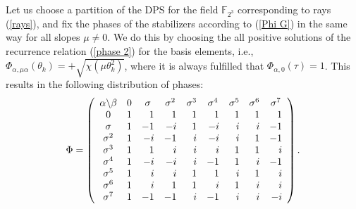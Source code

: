 \documentclass{article}
\begin{document}
Let us choose a partition of the DPS for the field $\mathbb{F}_{2^{3}}$
corresponding to rays (\ref{rays}), and fix the phases of the stabilizers
according to (\ref{Phi G}) in the same way for all slopes $\mu \neq 0$. We do
this by choosing the all positive solutions of the recurrence relation
(\ref{phase 2}) for the basis elements, i.e.,
$\Phi_{\alpha,\mu\alpha}(\theta_{k}) =
+\sqrt{\chi\left(\mu\theta_{k}^{2}\right)}$, where it is always fulfilled that
$\Phi_{\alpha,0}(\tau) = 1$. This results in the following distribution of
phases: 
\begin{equation}
  \Phi
  =\left( 
  \begin{array}{ccccccccc}
    \alpha \backslash \beta & 0 & \sigma & \sigma ^{2} & \sigma ^{3} & \sigma
    ^{4} & \sigma ^{5} & \sigma ^{6} & \sigma ^{7} \\ 
    0 & \multicolumn{1}{r}{1} & \multicolumn{1}{r}{1} & \multicolumn{1}{r}{1} & 
    \multicolumn{1}{r}{1} & \multicolumn{1}{r}{1} & \multicolumn{1}{r}{1} & 
    \multicolumn{1}{r}{1} & \multicolumn{1}{r}{1} \\ 
    \sigma & \multicolumn{1}{r}{1} & \multicolumn{1}{r}{-1} & \multicolumn{1}{r}{
    -i} & \multicolumn{1}{r}{1} & \multicolumn{1}{r}{-i} & \multicolumn{1}{r}{i}
    & \multicolumn{1}{r}{i} & \multicolumn{1}{r}{-1} \\ 
    \sigma ^{2} & \multicolumn{1}{r}{1} & \multicolumn{1}{r}{-i} & 
    \multicolumn{1}{r}{-1} & \multicolumn{1}{r}{i} & \multicolumn{1}{r}{-i} & 
    \multicolumn{1}{r}{i} & \multicolumn{1}{r}{1} & \multicolumn{1}{r}{-1} \\ 
    \sigma ^{3} & \multicolumn{1}{r}{1} & \multicolumn{1}{r}{1} & 
    \multicolumn{1}{r}{i} & \multicolumn{1}{r}{i} & \multicolumn{1}{r}{i} & 
    \multicolumn{1}{r}{1} & \multicolumn{1}{r}{1} & \multicolumn{1}{r}{i} \\ 
    \sigma ^{4} & \multicolumn{1}{r}{1} & \multicolumn{1}{r}{-i} & 
    \multicolumn{1}{r}{-i} & \multicolumn{1}{r}{i} & \multicolumn{1}{r}{-1} & 
    \multicolumn{1}{r}{1} & \multicolumn{1}{r}{i} & \multicolumn{1}{r}{-1} \\ 
    \sigma ^{5} & \multicolumn{1}{r}{1} & \multicolumn{1}{r}{i} & 
    \multicolumn{1}{r}{i} & \multicolumn{1}{r}{1} & \multicolumn{1}{r}{1} & 
    \multicolumn{1}{r}{i} & \multicolumn{1}{r}{1} & \multicolumn{1}{r}{i} \\ 
    \sigma ^{6} & \multicolumn{1}{r}{1} & \multicolumn{1}{r}{i} & 
    \multicolumn{1}{r}{1} & \multicolumn{1}{r}{1} & \multicolumn{1}{r}{i} & 
    \multicolumn{1}{r}{1} & \multicolumn{1}{r}{i} & \multicolumn{1}{r}{i} \\ 
    \sigma ^{7} & \multicolumn{1}{r}{1} & \multicolumn{1}{r}{-1} & 
    \multicolumn{1}{r}{-1} & \multicolumn{1}{r}{i} & \multicolumn{1}{r}{-1} & 
    \multicolumn{1}{r}{i} & \multicolumn{1}{r}{i} & \multicolumn{1}{r}{-i}
  \end{array}
  \right).
\end{equation}
\end{document}
